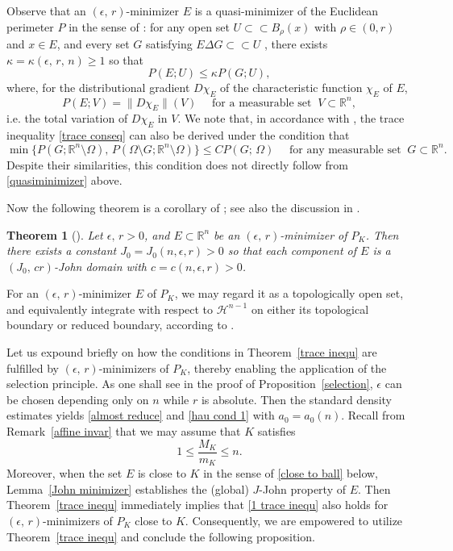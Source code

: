 \documentclass[reqno,11pt]{amsart}
\def\ez{\epsilon}
\newtheorem{thm}{Theorem}[section]
\numberwithin{equation}{section}
\theoremstyle{remark}
\begin{document}
Observe that
an $(\ez,\,r)$-minimizer $E$ is a quasi-minimizer of the Euclidean perimeter $P$ in the sense of \cite[Definition 3.1]{KKLS2013}: for  any open set $U\subset\subset B_\rho(x)$ with  $\rho\in (0, r)$ and $x\in E$, and every set $G$ satisfying  $E\Delta G\subset \subset U$ 
, there exists $\kappa=\kappa(\ez,\,r,\,n)\ge 1$ so that 
\begin{equation}\label{quasiminimizer}
   P(E; U)\le\kappa P(G; U), 
\end{equation} 
where, for the distributional gradient $D\chi_E$ of the characteristic function $\chi_E$ of $E$, 
$$P(E;V)=\|D\chi_E\|(V)\quad \text{ for a measurable set } \ V\subset\mathbb R^n,$$
i.e. the total variation of $D\chi_E$ in $V$. We note that, in accordance with \cite[Theorem 9.6.4]{M2011}, the trace inequality \eqref{trace conseq} can also be derived under the condition that
$$\min\{P(G;\mathbb R^n\setminus \Omega),\,P(\Omega\setminus G;\mathbb R^n\setminus \Omega)\}\le C P(G;\,\Omega) \quad \text{ for any measurable set }\  G\subset \mathbb R^n. $$
Despite their similarities, this condition does not directly follow from \eqref{quasiminimizer} above.


Now the following theorem is a corollary of \cite{DS1998}; see also the discussion in \cite[Page 1620]{KKLS2013}. 
\begin{thm}[\cite{DS1998}]\label{main thm}
Let $\ez,\,r>0$, and $E\subset \mathbb R^n$ be an $(\ez,\,r)$-minimizer of $P_K$. Then there exists a constant $J_0=J_0\left(n,\epsilon, r\right)>0$ so that each component of $E$ is a  $(J_0,\, cr)$-John domain with $c=c\left (n,\epsilon, r\right)>0$.
\end{thm}

For an $(\ez,\,r)$-minimizer $E$  of $P_K$, we may regard it as a topologically open set, and equivalently integrate with respect to $\mathcal H^{n-1}$ on either its topological boundary or reduced boundary, according to \cite[Corollary 3.6]{ANP2002}. 




Let us expound briefly on how the conditions in Theorem~\ref{trace inequ} are fulfilled by $(\ez,\,r)$-minimizers of $P_K$, thereby enabling the application of the selection principle. As one shall see in the proof of Proposition~\ref{selection}, $\ez$ can be chosen depending only on $n$ while $r$ is absolute.  
Then the standard density estimates \cite[Theorem 21.11]{M2012} yields \eqref{almost reduce} and \eqref{hau cond 1} with $a_0=a_0(n)$.
Recall from Remark~\ref{affine invar} that we may assume that $K$ satisfies
$$1\le \frac{M_K}{m_K}\le n.$$
Moreover, when the set $E$ is close to $K$  in the sense of \eqref{close to ball} below, Lemma~\ref{John minimizer} establishes the (global) $J$-John property of $E$.
Then Theorem~\ref{trace inequ} immediately implies that \eqref{1 trace inequ} also holds for $(\ez,\,r)$-minimizers of $P_K$ close to $K$.
 Consequently, we are empowered to utilize Theorem~\ref{trace inequ} and conclude the following proposition. 
 
\end{document}

